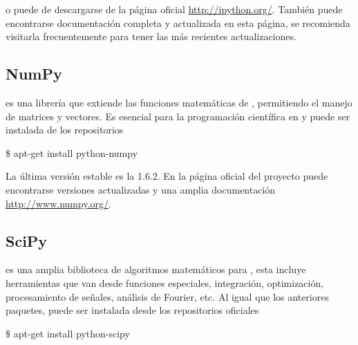 o puede de descargarse de la página oficial \url{http://ipython.org/}. 
También puede encontrarse documentación completa y actualizada en esta 
página, se recomienda visitarla frecuentemente para tener las más recientes 
actualizaciones.






\subsection*{NumPy}

\numpy es una librería que extiende las funciones matemáticas de \python, 
permitiendo el manejo de matrices y vectores. Es esencial para la 
programación científica en \python y puede ser instalada de los repositorios


\begin{listing}[style=consola, numbers=none]
\$ apt-get install python-numpy
\end{listing}


La última versión estable es la 1.6.2. En la página oficial del proyecto 
puede encontrarse versiones actualizadas y una amplia documentación 
\url{http://www.numpy.org/}.





\subsection*{SciPy}

\scipy es una amplia biblioteca de algoritmos matemáticos para \python, 
esta incluye herramientas que van desde funciones especiales, integración,
optimización, procesamiento de señales, análisis de Fourier, etc. Al igual
que los anteriores paquetes, puede ser instalada desde los repositorios 
oficiales


\begin{listing}[style=consola, numbers=none]
\$ apt-get install python-scipy
\end{listing}


